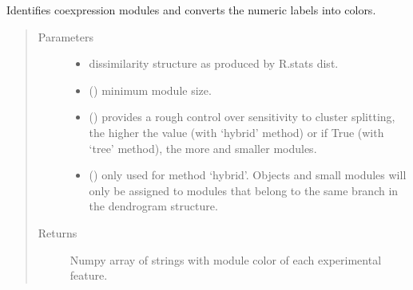 \documentclass[letterpaper,10pt,english]{sphinxmanual}
\begin{document}

\begin{fulllineitems}
\label{\detokenize{_autosummary/analytics_core.analytics:analytics_core.analytics.wgcnaAnalysis.identify_module_colors}}
Identifies co\sphinxhyphen{}expression modules and converts the numeric labels into colors.
\begin{quote}\begin{description}
\item[{Parameters}] \leavevmode\begin{itemize}
\item {} 
 \textendash{} dissimilarity structure as produced by R.stats dist.

\item {} 
 () \textendash{} minimum module size.

\item {} 
 () \textendash{} provides a rough control over sensitivity to cluster splitting, the higher the value (with ‘hybrid’ method) or if True (with ‘tree’ method), the more and smaller modules.

\item {} 
 () \textendash{} only used for method ‘hybrid’. Objects and small modules will only be assigned to modules that belong to the same branch in the dendrogram structure.

\end{itemize}

\item[{Returns}] \leavevmode
Numpy array of strings with module color of each experimental feature.

\end{description}\end{quote}

\end{fulllineitems}
\end{document}
